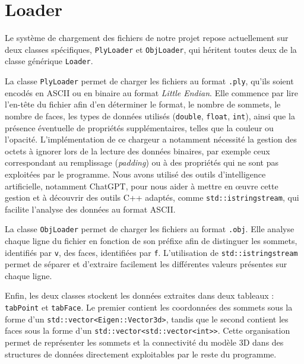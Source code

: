 \documentclass[12pt,a4paper]{article}
\begin{document}
\vspace{4cm}
\newpage
\section{Loader}

 
Le système de chargement des fichiers de notre projet repose actuellement sur deux classes spécifiques, \texttt{PlyLoader} et \texttt{ObjLoader}, qui héritent toutes deux de la classe générique \texttt{Loader}.

La classe \texttt{PlyLoader} permet de charger les fichiers au format \texttt{.ply}, qu'ils soient encodés en ASCII ou en binaire au format \textit{Little Endian}. Elle commence par lire l'en-tête du fichier afin d'en déterminer le format, le nombre de sommets, le nombre de faces, les types de données utilisés (\texttt{double}, \texttt{float}, \texttt{int}), ainsi que la présence éventuelle de propriétés supplémentaires, telles que la couleur ou l'opacité.
L'implémentation de ce chargeur a notamment nécessité la gestion des octets à ignorer lors de la lecture des données binaires, par exemple ceux correspondant au remplissage (\textit{padding}) ou à des propriétés qui ne sont pas exploitées par le programme. Nous avons utilisé des outils d'intelligence artificielle, notamment ChatGPT, pour nous aider à mettre en œuvre cette gestion et à découvrir des outils C++ adaptés, comme \texttt{std::istringstream}, qui facilite l'analyse des données au format ASCII.

La classe \texttt{ObjLoader} permet de charger les fichiers au format \texttt{.obj}. Elle analyse chaque ligne du fichier en fonction de son préfixe afin de distinguer les sommets, identifiés par \texttt{v}, des faces, identifiées par \texttt{f}. L'utilisation de \texttt{std::istringstream} permet de séparer et d'extraire facilement les différentes valeurs présentes sur chaque ligne.

Enfin, les deux classes stockent les données extraites dans deux tableaux : \texttt{tabPoint} et \texttt{tabFace}. Le premier contient les coordonnées des sommets sous la forme d'un \texttt{std::vector<Eigen::Vector3d>}, tandis que le second contient les faces sous la forme d'un \texttt{std::vector<std::vector<int>>}. Cette organisation permet de représenter les sommets et la connectivité du modèle 3D dans des structures de données directement exploitables par le reste du programme.
\end{document}
